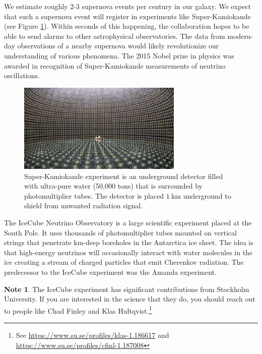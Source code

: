 \documentclass[a4paper,12pt]{article}
\theoremstyle{remark}
\newcommand{\mrm}[1]{\mathrm{#1}}
\renewcommand{\=}[1]{\stackrel{#1}{=}} %
\newcommand{\linkc}[1]{\textcolor{linkc}{#1}}
\theoremstyle{plain}
\theoremstyle{definition}
\newtheorem*{definitionT}{Note}%
\newenvironment{note}{
\begin{dBox}
\begin{definitionT}}
{\end{definitionT}
\end{dBox}}
\begin{document}
We estimate roughly 2-3 supernova events per century in our galaxy. We expect that such a supernova event will register in experiments like Super-Kamiokande (see Figure \ref{fig:skamiokande}). Within seconds of this happening, the collaboration hopes to be able to send alarms to other astrophysical observatories. The data from modern-day observations of a nearby supernova would likely revolutionize our understanding of various phenomena. The 2015 Nobel prize in physics was awarded in recognition of Super-Kamiokande measurements of neutrino oscillations. 

\begin{figure}[t]
\begin{center}
    \includegraphics*[angle=0,width=0.7\textwidth]{img/superkami.jpg}
    \caption[Super Kamiokande experiment]{Super-Kamiokande experiment is an underground detector filled with ultra-pure water (50,000 tons) that is surrounded by photomultiplier tubes. The detector is placed $1 \:\mrm{km}$ underground to shield from unwanted radiation signal.}
\label{fig:skamiokande}
\end{center}
\end{figure}

The IceCube Neutrino Observatory is a large scientific experiment placed at the South Pole. It uses thousands of photomultiplier tubes mounted on vertical strings that penetrate km-deep boreholes in the Antarctica ice sheet. The idea is that high-energy neutrinos will occasionally interact with water molecules in the ice creating a stream of charged particles that emit Cherenkov radiation. The predecessor to the IceCube experiment was the Amanda experiment.

\begin{note}
The IceCube experiment has significant contributions from Stockholm University. If you are interested in the science that they do, you should reach out to people like Chad Finley and Klas Hultqvist.\footnote{See \href{https://www.su.se/profiles/klas-1.186617}{\linkc{https://www.su.se/profiles/klas-1.186617}} and \href{https://www.su.se/profiles/cfinl-1.187008}{\linkc{https://www.su.se/profiles/cfinl-1.187008}}}
\end{note}
\end{document}
